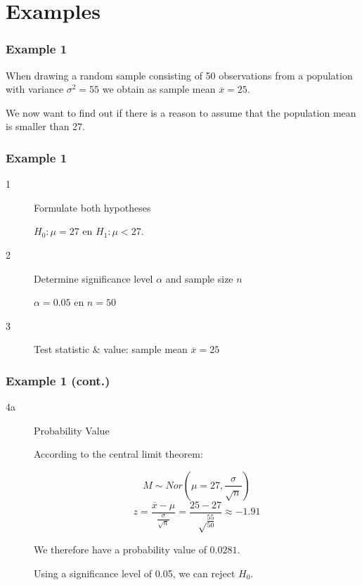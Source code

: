 \documentclass[aspectratio=169]{beamer}
\begin{document}
\section{Examples}

\begin{frame}
  \frametitle{Example 1}
  When drawing a random sample consisting of 50 observations from a population with variance $\sigma^2 = 55$ we obtain as sample mean $\overline{x} = 25$.
  
  We now want to find out if there is a reason to assume that the population mean is smaller than 27.
  
\end{frame}

\begin{frame}
  \frametitle{Example 1}
  
  \begin{description}
    \item[1] Formulate both hypotheses
    
    $H_{0} : \mu = 27$ en $H_{1}: \mu < 27$.
    
    \item[2] Determine significance level $\alpha$ and sample size $n$
    
    $\alpha = 0.05$ en $n=50$
    
    \item[3] Test statistic \& value: sample mean $\overline{x} = 25$
    
    
  \end{description}
\end{frame}

\begin{frame}
  \frametitle{Example 1 (cont.)}
  
  \begin{description}
    \item[4a] Probability Value
    
    According to the central limit theorem:
    
    \[ M \sim Nor(\mu = 27, \frac{\sigma}{\sqrt{n}}) \]
    \[ z = \frac{\overline{x} - \mu}{\frac{\sigma}{\sqrt{n}}} = \frac{25-27}{\sqrt\frac{55}{50}} \approx -1.91\]
    
    We therefore have a probability value of $0.0281$.
    
    Using a significance level of 0.05, we can reject $H_{0}$.
  \end{description}
  
\end{frame}
\end{document}
